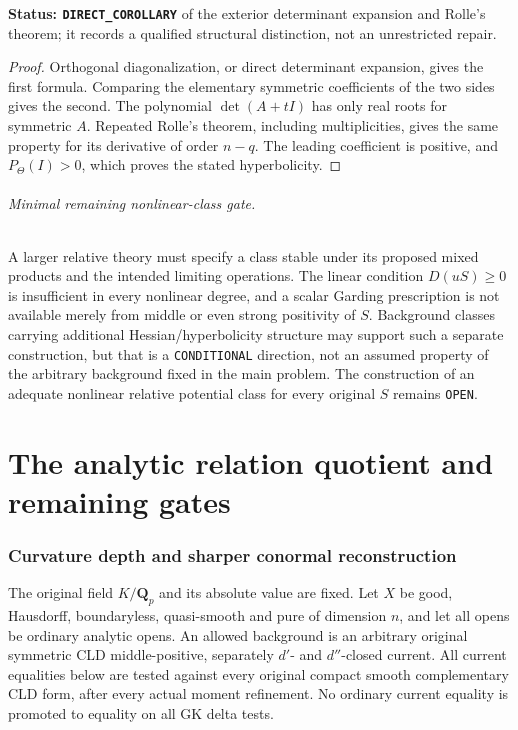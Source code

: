 \documentclass[11pt,a4paper]{article}
\numberwithin{equation}{section}
\theoremstyle{definition}
\theoremstyle{remark}
\begin{document}
\noindent\textbf{Status: \texttt{DIRECT\_COROLLARY}} of
the exterior determinant expansion and Rolle's theorem;
it records a qualified structural distinction, not an
unrestricted repair.

\begin{proof}
Orthogonal diagonalization, or direct determinant
expansion, gives the first formula.  Comparing the
elementary symmetric coefficients of the two sides
gives the second.  The polynomial $\det(A+tI)$ has
only real roots for symmetric $A$.  Repeated Rolle's
theorem, including multiplicities, gives the same
property for its derivative of order $n-q$.
The leading coefficient is positive, and
$P_\Theta(I)>0$, which proves the stated hyperbolicity.
\end{proof}

\paragraph{Minimal remaining nonlinear-class gate.}
A larger relative theory must specify a class stable
under its proposed mixed products and the intended
limiting operations.  The linear condition $D(uS)\ge0$
is insufficient in every nonlinear degree, and a scalar
Garding prescription is not available merely from middle
or even strong positivity of $S$.  Background classes
carrying additional Hessian/hyperbolicity structure may
support such a separate construction, but that is a
\texttt{CONDITIONAL} direction, not an assumed property
of the arbitrary background fixed in the main problem.
The construction of an adequate nonlinear relative
potential class for every original $S$ remains
\texttt{OPEN}.



\part{The analytic relation quotient and remaining gates}

\section{Curvature depth and sharper conormal reconstruction}
\label{sec:r12-curvature-depth}

The original field $K/\mathbf Q_p$ and its absolute value are fixed.
Let $X$ be good, Hausdorff, boundaryless, quasi-smooth and pure of
dimension $n$, and let all opens be ordinary analytic opens.
An allowed background is an arbitrary original symmetric CLD
middle-positive, separately $d'$- and $d''$-closed current.
All current equalities below are tested against every original compact
smooth complementary CLD form, after every actual moment refinement.
No ordinary current equality is promoted to equality on all GK delta
tests.
\end{document}
